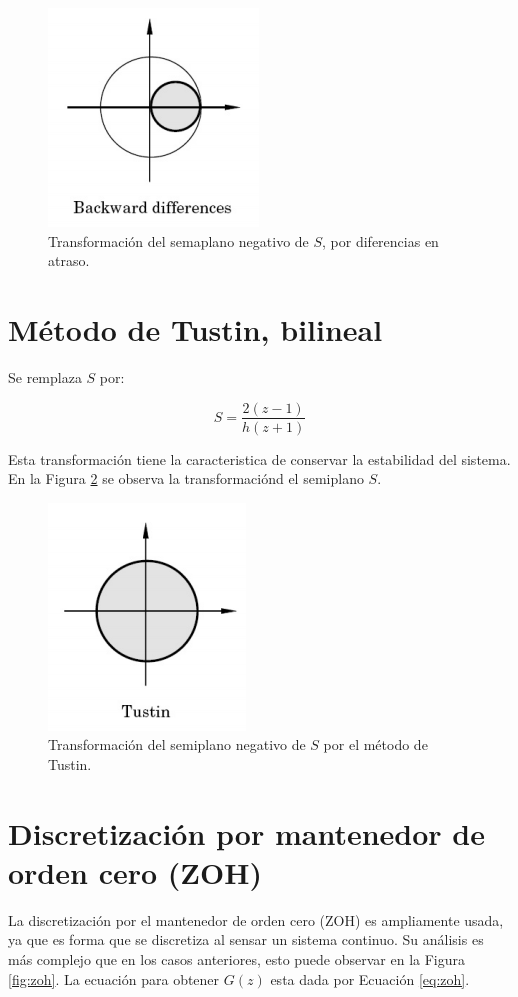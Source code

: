 \begin{figure}
    \centering
    \includegraphics[width=.3\textwidth]{img/atras.png}
    \caption{Transformación del semaplano negativo de $S$, por diferencias en atraso.}
    \label{fig:atras}
\end{figure}

\section{Método de Tustin, bilineal}

Se remplaza $S$ por: 

\begin{equation}
    S = \frac{2(z-1)}{h(z+1)}
\end{equation}

Esta transformación tiene la caracteristica de conservar la estabilidad del sistema. 
En la Figura \ref{fig:tustin} se observa la transformaciónd el semiplano $S$. 

\begin{figure}
    \centering
    \includegraphics[width=.3\textwidth]{img/tustin.png}
    \caption{Transformación del semiplano negativo de $S$ por el método de Tustin.}
    \label{fig:tustin}
\end{figure}

\section{Discretización por mantenedor de orden cero (ZOH)}

La discretización por el mantenedor de orden cero (ZOH) es ampliamente usada, ya que es 
forma que se discretiza al sensar un sistema continuo. Su análisis es más complejo que en los casos anteriores, 
esto puede observar en la Figura \ref{fig:zoh}. La ecuación para obtener $G(z)$ esta dada por Ecuación \ref{eq:zoh}.

